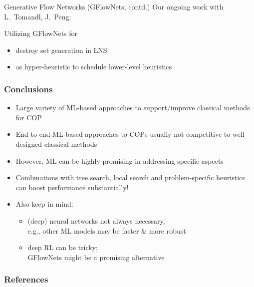 \documentclass[aspectratio=1610]{beamer}
\renewcommand{\footnotesize}{\scriptsize}
\begin{document}
\begin{frame}{Generative Flow Networks (GFlowNets, contd.)}
Our ongoing work with L.~Tomandl, J.~Peng:

\bigskip
Utilizing GFlowNets for

\medskip
\begin{itemize}
	\itemsep2ex
	\item destroy set generation in LNS
	\item as hyper-heuristic to schedule lower-level heuristics
\end{itemize}
\end{frame}


\begin{frame}
	\frametitle{Conclusions}
	\begin{itemize}
		\itemsep2.5ex
		\item Large variety of ML-based approaches to support/improve classical methods for COP
		\item End-to-end ML-based approaches to COPs usually not competitive to well-designed classical methods
		\item However, ML can be highly promising in addressing specific aspects
		\item Combinations with tree search, local search and problem-specific heuristics can boost performance substantially!
		\item Also keep in mind: 
		\begin{itemize}
			\item (deep) neural networks not always necessary,\\
			e.g., other ML models may be faster \& more robust
			\item deep RL can be tricky;\\ GFlowNets might be a promising alternative
		\end{itemize}
	\end{itemize}
\end{frame}


\begin{frame}[allowframebreaks]
	\frametitle{References}
	\footnotesize
	
	
\end{frame}
\end{document}
